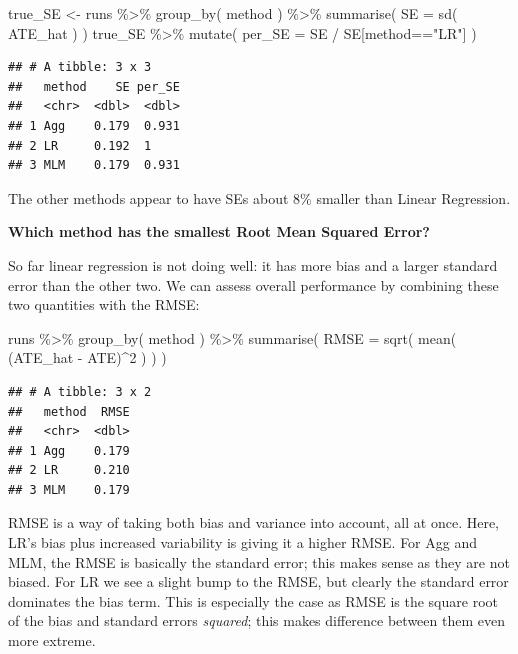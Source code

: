 \documentclass[
]{book}
\newenvironment{Shaded}{\begin{snugshade}}{\end{snugshade}}
\newcommand{\AttributeTok}[1]{\textcolor[rgb]{0.77,0.63,0.00}{#1}}
\newcommand{\DecValTok}[1]{\textcolor[rgb]{0.00,0.00,0.81}{#1}}
\newcommand{\FunctionTok}[1]{\textcolor[rgb]{0.00,0.00,0.00}{#1}}
\newcommand{\NormalTok}[1]{#1}
\newcommand{\OtherTok}[1]{\textcolor[rgb]{0.56,0.35,0.01}{#1}}
\newcommand{\SpecialCharTok}[1]{\textcolor[rgb]{0.00,0.00,0.00}{#1}}
\newcommand{\StringTok}[1]{\textcolor[rgb]{0.31,0.60,0.02}{#1}}
\begin{document}
\begin{Shaded}
\begin{Highlighting}[]
\NormalTok{true\_SE }\OtherTok{\textless{}{-}}\NormalTok{ runs }\SpecialCharTok{\%\textgreater{}\%} 
  \FunctionTok{group\_by}\NormalTok{( method ) }\SpecialCharTok{\%\textgreater{}\%}
  \FunctionTok{summarise}\NormalTok{( }
    \AttributeTok{SE =} \FunctionTok{sd}\NormalTok{( ATE\_hat )}
\NormalTok{  )}
\NormalTok{true\_SE }\SpecialCharTok{\%\textgreater{}\%}
  \FunctionTok{mutate}\NormalTok{( }\AttributeTok{per\_SE =}\NormalTok{ SE }\SpecialCharTok{/}\NormalTok{ SE[method}\SpecialCharTok{==}\StringTok{"LR"}\NormalTok{] )}
\end{Highlighting}
\end{Shaded}

\begin{verbatim}
## # A tibble: 3 x 3
##   method    SE per_SE
##   <chr>  <dbl>  <dbl>
## 1 Agg    0.179  0.931
## 2 LR     0.192  1    
## 3 MLM    0.179  0.931
\end{verbatim}

The other methods appear to have SEs about 8\% smaller than Linear Regression.

\textbf{Which method has the smallest Root Mean Squared Error?}

So far linear regression is not doing well: it has more bias and a larger standard error than the other two.
We can assess overall performance by combining these two quantities with the RMSE:

\begin{Shaded}
\begin{Highlighting}[]
\NormalTok{runs }\SpecialCharTok{\%\textgreater{}\%} 
  \FunctionTok{group\_by}\NormalTok{( method ) }\SpecialCharTok{\%\textgreater{}\%}
  \FunctionTok{summarise}\NormalTok{( }
    \AttributeTok{RMSE =} \FunctionTok{sqrt}\NormalTok{( }\FunctionTok{mean}\NormalTok{( (ATE\_hat }\SpecialCharTok{{-}}\NormalTok{ ATE)}\SpecialCharTok{\^{}}\DecValTok{2}\NormalTok{ ) )}
\NormalTok{  )}
\end{Highlighting}
\end{Shaded}

\begin{verbatim}
## # A tibble: 3 x 2
##   method  RMSE
##   <chr>  <dbl>
## 1 Agg    0.179
## 2 LR     0.210
## 3 MLM    0.179
\end{verbatim}

RMSE is a way of taking both bias and variance into account, all at once.
Here, LR's bias plus increased variability is giving it a higher RMSE.
For Agg and MLM, the RMSE is basically the standard error; this makes sense as they are not biased.
For LR we see a slight bump to the RMSE, but clearly the standard error dominates the bias term.
This is especially the case as RMSE is the square root of the bias and standard errors \emph{squared}; this makes difference between them even more extreme.
\end{document}
